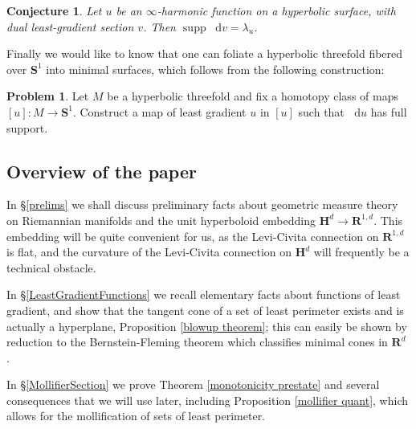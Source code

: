 \documentclass[reqno,12pt,letterpaper]{amsart}
\newcommand{\RR}{\mathbf{R}}
\newcommand{\Hyp}{\mathbf H}
\newcommand{\Sph}{\mathbf S}
\DeclareMathOperator{\supp}{supp}
\newcommand*\dif{\mathop{}\!\mathrm{d}}
\newtheorem{conjecture}[theorem]{Conjecture}
\theoremstyle{definition}
\newtheorem{problem}[theorem]{Problem}
\numberwithin{equation}{section}
\begin{document}
\begin{conjecture}\label{two laminations agree}
Let $u$ be an $\infty$-harmonic function on a hyperbolic surface, with dual least-gradient section $v$.
Then $\supp \dif v = \lambda_u$.
\end{conjecture}

Finally we would like to know that one can foliate a hyperbolic threefold fibered over $\Sph^1$ into minimal surfaces, which follows from the following construction:

\begin{problem}
Let $M$ be a hyperbolic threefold and fix a homotopy class of maps $[u]: M \to \Sph^1$.
Construct a map of least gradient $u$ in $[u]$ such that $\dif u$ has full support.
\end{problem}

\subsection{Overview of the paper}
In \S\ref{prelims} we shall discuss preliminary facts about geometric measure theory on Riemannian manifolds and the unit hyperboloid embedding $\Hyp^d \to \RR^{1, d}$.
This embedding will be quite convenient for us, as the Levi-Civita connection on $\RR^{1, d}$ is flat, and the curvature of the Levi-Civita connection on $\Hyp^d$ will frequently be a technical obstacle.

In \S\ref{LeastGradientFunctions} we recall elementary facts about functions of least gradient, and show that the tangent cone of a set of least perimeter exists and is actually a hyperplane, Proposition \ref{blowup theorem}; this can easily be shown by reduction to the Bernstein-Fleming theorem which classifies minimal cones in $\RR^d$ \cite[Theorem 17.3]{Giusti77}.

In \S\ref{MollifierSection} we prove Theorem \ref{monotonicity prestate} and several consequences that we will use later, including Proposition \ref{mollifier quant}, which allows for the mollification of sets of least perimeter.
\end{document}
